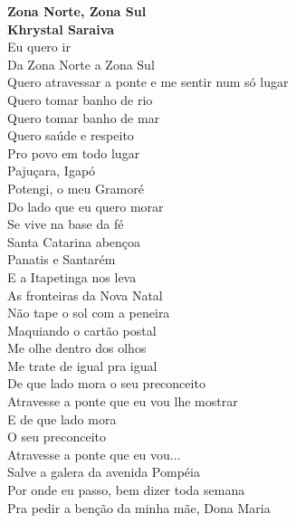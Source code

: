 \documentclass[
	12pt,				%
	openright,			%
	twoside,			%
	a4paper,			%
	chapter=TITLE,		%
	section=TITLE,		%
	subsection=TITLE,	%
	subsubsection=TITLE,%
	spanish,            %
	english,			%
	brazil				%
	]{abntex2}
\begin{document}
\begin{dedicatoria}
\centering

\textbf{Zona Norte, Zona Sul\\
Khrystal Saraiva}\\
       
     {\calligra Eu quero ir\\
       Da Zona Norte a Zona Sul\\
       Quero atravessar a ponte e me sentir num só lugar\\
       
       Quero tomar banho de rio\\
       Quero tomar banho de mar\\
       Quero saúde e respeito\\
       Pro povo em todo lugar\\
       
       Pajuçara, Igapó\\
       Potengi, o meu Gramoré\\
       Do lado que eu quero morar\\
       Se vive na base da fé\\
       
       Santa Catarina abençoa\\
       Panatis e Santarém\\
       E a Itapetinga nos leva\\
       As fronteiras da Nova Natal\\
       
       Não tape o sol com a peneira\\
       Maquiando o cartão postal\\
       Me olhe dentro dos olhos\\
       Me trate de igual pra igual\\
       
       De que lado mora o seu preconceito\\
       Atravesse a ponte que eu vou lhe mostrar\\
       
       E de que lado mora\\
       O seu preconceito\\
       Atravesse a ponte que eu vou...\\
       
       Salve a galera da avenida Pompéia\\
       Por onde eu passo, bem dizer toda semana\\
       Pra pedir a benção da minha mãe, Dona Maria\\
       
}
\end{dedicatoria}
\end{document}
